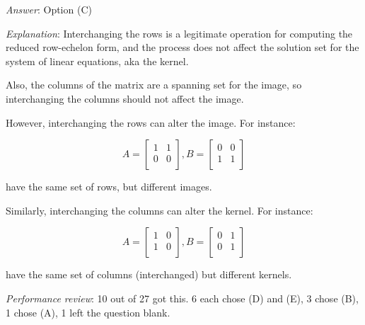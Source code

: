 \documentclass[10pt]{amsart}
\begin{document}
\begin{enumerate}
  {\em Answer}: Option (C)

  {\em Explanation}: Interchanging the rows is a legitimate operation
  for computing the reduced row-echelon form, and the process does not
  affect the solution set for the system of linear equations, aka the
  kernel.

  Also, the columns of the matrix are a spanning set for the image, so
  interchanging the columns should not affect the image.

  However, interchanging the rows can alter the image. For instance:

  $$A = \left[\begin{matrix} 1 & 1 \\ 0 & 0 \\\end{matrix}\right], B = \left[\begin{matrix} 0 & 0 \\ 1 & 1 \\\end{matrix}\right]$$

  have the same set of rows, but different images.

  Similarly, interchanging the columns can alter the kernel. For
  instance:

  $$A = \left[\begin{matrix} 1 & 0 \\ 1 & 0 \\\end{matrix}\right], B = \left[\begin{matrix} 0 & 1 \\ 0 & 1 \\\end{matrix}\right]$$

  have the same set of columns (interchanged) but different kernels.

  {\em Performance review}: 10 out of 27 got this. 6 each chose (D)
  and (E), 3 chose (B), 1 chose (A), 1 left the question blank.
\end{enumerate}
\end{document}
